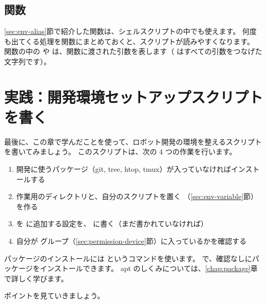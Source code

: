 \subsection{関数}

\ref{sec:env-alias}節で紹介した関数は、シェルスクリプトの中でも使えます。
何度も出てくる処理を関数にまとめておくと、スクリプトが読みやすくなります。
関数の中の  や \cmd{\$*} は、関数に渡された引数を表します（\cmd{\$*} はすべての引数をつなげた文字列です）。


\section{実践：開発環境セットアップスクリプトを書く}
\label{sec:shellscript-practice}

最後に、この章で学んだことを使って、ロボット開発の環境を整えるスクリプトを書いてみましょう。
このスクリプトは、次の 4 つの作業を行います。

\begin{enumerate}
  \item 開発に使うパッケージ（git, tree, htop, tmux）が入っていなければインストールする
  \item 作業用のディレクトリと、自分のスクリプトを置く （\ref{sec:env-variable}節）を作る
  \item {} を  に追加する設定を、 に書く（まだ書かれていなければ）
  \item 自分が  グループ（\ref{sec:permission-device}節）に入っているかを確認する
\end{enumerate}

パッケージのインストールには  というコマンドを使います。
 で、確認なしにパッケージをインストールできます。
apt のしくみについては、\ref{chap:package}章で詳しく学びます。


ポイントを見ていきましょう。

